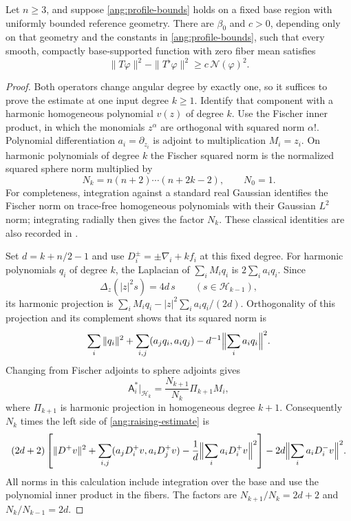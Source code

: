 \begin{lemma}\label{ang:raising}
Let $n\ge3$, and suppose \eqref{ang:profile-bounds} holds on a fixed
base region with uniformly bounded reference geometry.  There are
$\beta_0$ and $c>0$, depending only on that geometry and the constants in
\eqref{ang:profile-bounds}, such that every smooth, compactly
base-supported function with zero fiber mean satisfies
\begin{equation}\label{ang:raising-estimate}
 \|T\varphi\|^2-\|T^\flat\varphi\|^2
       \ge c\,\mathcal N(\varphi)^2.
\end{equation}
\end{lemma}

\begin{proof}
Both operators change angular degree by exactly one, so it suffices to
prove the estimate at one input degree $k\ge1$.  Identify that component
with a harmonic homogeneous polynomial $v(z)$ of degree $k$.  Use the
Fischer inner product, in which the monomials $z^\alpha$ are orthogonal
with squared norm $\alpha!$.  Polynomial differentiation $a_i=\partial_{z_i}$
is adjoint to multiplication $M_i=z_i$.  On harmonic polynomials of degree
$k$ the Fischer squared norm is the normalized squared sphere norm
multiplied by
\[
 N_k=n(n+2)\cdots(n+2k-2),\qquad N_0=1.
\]
For completeness, integration against a standard real Gaussian identifies
the Fischer norm on trace-free homogeneous polynomials with their
Gaussian $L^2$ norm;
integrating radially then gives the factor $N_k$.  These classical
identities are also recorded in \cite[Equation~(2.1) and
Theorem~2.1]{Render08}.

Set $d=k+n/2-1$ and use $D_i^\pm=\pm\nabla_i+k f_i$ at this fixed degree.
For harmonic polynomials $q_i$ of degree $k$, the Laplacian of
$\sum_iM_iq_i$ is $2\sum_i a_iq_i$.  Since
\[
 \Delta_z(|z|^2s)=4d\,s\qquad(s\in\mathcal H_{k-1}),
\]
its harmonic projection is
$\sum_iM_iq_i-|z|^2\sum_i a_iq_i/(2d)$.  Orthogonality of this projection
and its complement shows that its squared norm is
\[
 \sum_i\|q_i\|^2+\sum_{i,j}(a_jq_i,a_iq_j)
             -d^{-1}\Bigl\|\sum_i a_iq_i\Bigr\|^2.
\]
Changing from Fischer adjoints to sphere adjoints gives
\[
 \mathsf A_i^*|_{\mathcal H_k}
   =\frac{N_{k+1}}{N_k}\Pi_{k+1}M_i,
\]
where $\Pi_{k+1}$ is harmonic projection in homogeneous degree $k+1$.
Consequently $N_k$ times the left side of
\eqref{ang:raising-estimate} is
\begin{equation}\label{ang:Fock-difference}
 \begin{split}
 (2d+2)\left[\|D^+v\|^2
   +\sum_{i,j}(a_jD_i^+v,a_iD_j^+v)
   -\frac1d\Bigl\|\sum_i a_iD_i^+v\Bigr\|^2\right]
 -2d\Bigl\|\sum_i a_iD_i^-v\Bigr\|^2.
 \end{split}
\end{equation}
All norms in this calculation include integration over the base and use
the polynomial inner product in the fibers.  The factors are
$N_{k+1}/N_k=2d+2$ and $N_k/N_{k-1}=2d$.


\end{proof}
